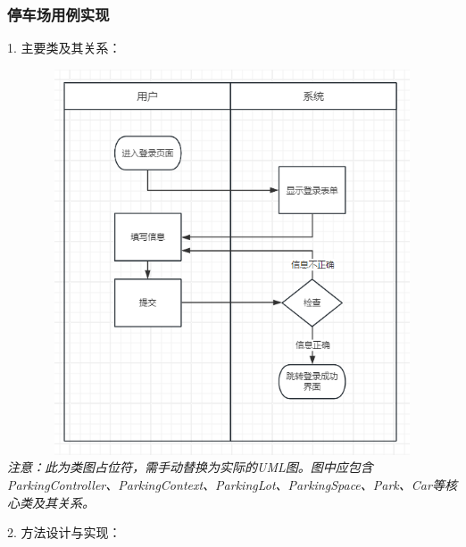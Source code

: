\documentclass[]{article}
\begin{document}
\hypertarget{ux505cux8f66ux573aux7528ux4f8bux5b9eux73b0}{%
\subsubsection{停车场用例实现}\label{ux505cux8f66ux573aux7528ux4f8bux5b9eux73b0}}

1. 主要类及其关系：

\includegraphics[width=6.2in,height=4.5in]{media/media/image1.png} %
\textit{注意：此为类图占位符，需手动替换为实际的UML图。图中应包含ParkingController、ParkingContext、ParkingLot、ParkingSpace、Park、Car等核心类及其关系。}

2. 方法设计与实现：
\end{document}
